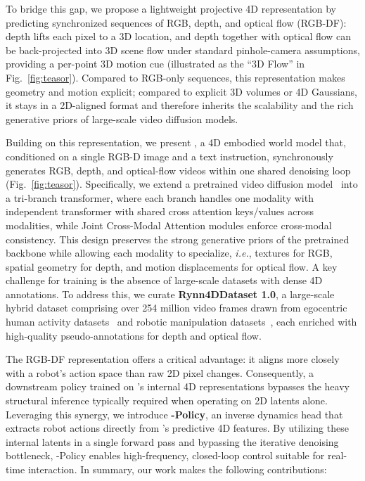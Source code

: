 To bridge this gap, we propose a lightweight projective 4D representation by predicting synchronized sequences of RGB, depth, and optical flow (RGB-DF): depth lifts each pixel to a 3D location, and depth together with optical flow can be back-projected into 3D scene flow under standard pinhole-camera assumptions, providing a per-point 3D motion cue (illustrated as the ``3D Flow'' in Fig.~\ref{fig:teasor}).
Compared to RGB-only sequences, this representation makes geometry and motion explicit; compared to explicit 3D volumes or 4D Gaussians, it stays in a 2D-aligned format and therefore inherits the scalability and the rich generative priors of large-scale video diffusion models.


Building on this representation, we present \textbf{\our}, a 4D embodied world model that, conditioned on a single RGB-D image and a text instruction, synchronously generates RGB, depth, and optical-flow videos within one shared denoising loop (Fig.~\ref{fig:teasor}).
Specifically, we extend a pretrained video diffusion model~\citep{wang2025wan} into a tri-branch transformer, where each branch handles one modality with independent transformer with shared cross attention keys/values across modalities, while Joint Cross-Modal Attention modules enforce cross-modal consistency.
This design preserves the strong generative priors of the pretrained backbone while allowing each modality to specialize, \textit{i.e.}, textures for RGB, spatial geometry for depth, and motion displacements for optical flow.
A key challenge for training \our is the absence of large-scale datasets with dense 4D annotations. To address this, we curate \textbf{Rynn4DDataset 1.0}, a large-scale hybrid dataset comprising over 254 million video frames drawn from egocentric human activity datasets~\citep{damen2020epic,wang2024egovid} and robotic manipulation datasets~\citep{wu2024robomind,liu2024rdt,jiang2025galaxea,wu2025robocoin,bu2025agibot}, each enriched with high-quality pseudo-annotations for depth and optical flow.


The RGB-DF representation offers a critical advantage: it aligns more closely with a robot’s action space than raw 2D pixel changes. Consequently, a downstream policy trained on \our's internal 4D representations bypasses the heavy structural inference typically required when operating on 2D latents alone. Leveraging this synergy, we introduce \textbf{\our-Policy}, an inverse dynamics head that extracts robot actions directly from \our’s predictive 4D features. By utilizing these internal latents in a single forward pass and bypassing the iterative denoising bottleneck, \our-Policy enables high-frequency, closed-loop control suitable for real-time interaction. In summary, our work makes the following contributions:

